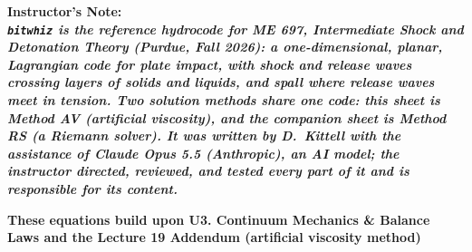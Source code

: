 \documentclass[11pt,addpoints]{exam}
\begin{document}
\noindent
\bf{Instructor's Note:}\normalfont\\

\noindent
\it{\texttt{bitwhiz} is the reference hydrocode for ME 697, Intermediate Shock and Detonation Theory (Purdue, Fall 2026): a one-dimensional, planar, Lagrangian code for plate impact, with shock and release waves crossing layers of solids and liquids, and spall where release waves meet in tension. Two solution methods share one code: this sheet is Method AV (artificial viscosity), and the companion sheet is Method RS (a Riemann solver). It was written by D.~Kittell with the assistance of Claude Opus 5.5 (Anthropic), an AI model; the instructor directed, reviewed, and tested every part of it and is responsible for its content.}\normalfont\vspace{1.5em}

\textbf{These equations build upon U3. Continuum Mechanics {\&} Balance Laws and the Lecture 19 Addendum (artificial viscosity method)}\vspace{1em}
\end{document}
